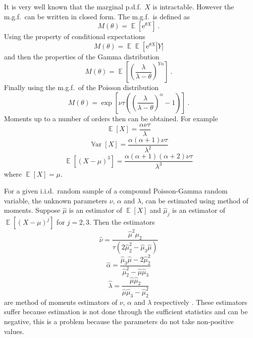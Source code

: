\documentclass[a4paper]{proc}
\DeclareMathOperator{\expectation}{\mathbb{E}}
\DeclareMathOperator{\variance}{\mathbb{V}ar}
\newcommand{\euler}{\mathrm{e}}
\begin{document}
It is very well known that the marginal p.d.f.~$X$ is intractable. However the m.g.f.~can be written in closed form. The m.g.f.~is defined as
\begin{equation}
M(\theta)=\expectation\left[\euler^{\theta X}\right] \ .
\end{equation}
Using the property of conditional expectations
\begin{equation*}
M(\theta)=\expectation\expectation\left[\euler^{\theta X}\right|Y]
\end{equation*}
and then the properties of the Gamma distribution
\begin{equation*}
M(\theta)=\expectation\left[\left(\frac{\lambda}{\lambda-\theta}\right)^{Y\alpha}\right] \ .
\end{equation*}
Finally using the m.g.f.~of the Poisson distribution
\begin{equation}
M(\theta)=\exp\left[\nu\tau\left(\left(\frac{\lambda}{\lambda-\theta}\right)^{\alpha}-1\right)\right] \ .
\end{equation}
Moments up to a number of orders then can be obtained. For example
\begin{equation}
\expectation\left[X\right]=\frac{\alpha\nu\tau}{\lambda}
\end{equation}
\begin{equation}
\variance\left[X\right]=\frac{\alpha(\alpha+1)\nu\tau}{\lambda^2}
\end{equation}
\begin{equation}
\expectation\left[(X-\mu)^3\right] = \frac{\alpha(\alpha+1)(\alpha+2)\nu\tau}{\lambda^3}
\end{equation}
where $\expectation\left[X\right]=\mu$.

For a given i.i.d.~random sample of a compound Poisson-Gamma random variable, the unknown parameters $\nu$, $\alpha$ and $\lambda$, can be estimated using method of moments. Suppose $\widehat{\mu}$ is an estimator of $\expectation[X]$ and $\widehat{\mu}_j$ is an estimator of $\expectation\left[\left(X-\mu\right)^j\right]$ for $j=2,3$. Then the estimators
\begin{equation}
\widehat{\nu}=\frac{\widehat{\mu}^2\widehat{\mu}_2}{\tau\left(2\widehat{\mu}_2^2-\widehat{\mu}_3\widehat{\mu}\right)}
\end{equation}
\begin{equation}
\widehat{\alpha}=\frac{\widehat{\mu}_3\widehat{\mu}-2\widehat{\mu}_2^2}{\widehat{\mu}_2^2-\widehat{\mu}\widehat{\mu}_3}
\end{equation}
\begin{equation}
\widehat{\lambda}=\frac{\widehat{\mu}\widehat{\mu}_2}{\widehat{\mu}\widehat{\mu}_3-\widehat{\mu}_2^2}
\end{equation}
are method of moments estimators of $\nu$, $\alpha$ and $\lambda$ respectively \cite{withers2011compound}. These estimators suffer because estimation is not done through the sufficient statistics and can be negative, this is a problem because the parameters do not take non-positive values.
\end{document}
